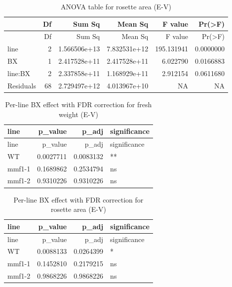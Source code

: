 \documentclass[
  10pt,
]{article}
\begin{document}
\begin{longtable}[]{@{}lrrrrr@{}}
\caption{ANOVA table for rosette area (E-V)}\tabularnewline
\toprule\noalign{}
& Df & Sum Sq & Mean Sq & F value & Pr(\textgreater F) \\
\midrule\noalign{}
\endfirsthead
\toprule\noalign{}
& Df & Sum Sq & Mean Sq & F value & Pr(\textgreater F) \\
\midrule\noalign{}
\endhead
\bottomrule\noalign{}
\endlastfoot
line & 2 & 1.566506e+13 & 7.832531e+12 & 195.131941 & 0.0000000 \\
BX & 1 & 2.417528e+11 & 2.417528e+11 & 6.022790 & 0.0166883 \\
line:BX & 2 & 2.337858e+11 & 1.168929e+11 & 2.912154 & 0.0611680 \\
Residuals & 68 & 2.729497e+12 & 4.013967e+10 & NA & NA \\
\end{longtable}

\begin{longtable}[]{@{}lrrl@{}}
\caption{Per-line BX effect with FDR correction for fresh weight
(E-V)}\tabularnewline
\toprule\noalign{}
line & p\_value & p\_adj & significance \\
\midrule\noalign{}
\endfirsthead
\toprule\noalign{}
line & p\_value & p\_adj & significance \\
\midrule\noalign{}
\endhead
\bottomrule\noalign{}
\endlastfoot
WT & 0.0027711 & 0.0083132 & ** \\
mmf1-1 & 0.1689862 & 0.2534794 & ns \\
mmf1-2 & 0.9310226 & 0.9310226 & ns \\
\end{longtable}

\begin{longtable}[]{@{}lrrl@{}}
\caption{Per-line BX effect with FDR correction for rosette area
(E-V)}\tabularnewline
\toprule\noalign{}
line & p\_value & p\_adj & significance \\
\midrule\noalign{}
\endfirsthead
\toprule\noalign{}
line & p\_value & p\_adj & significance \\
\midrule\noalign{}
\endhead
\bottomrule\noalign{}
\endlastfoot
WT & 0.0088133 & 0.0264399 & * \\
mmf1-1 & 0.1452810 & 0.2179215 & ns \\
mmf1-2 & 0.9868226 & 0.9868226 & ns \\
\end{longtable}

\newpage
\end{document}
